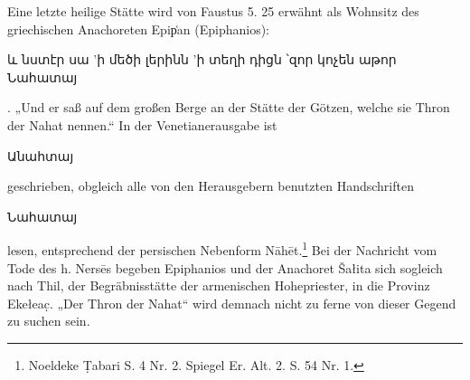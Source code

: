 \documentclass{article}
\begin{document}
Eine letzte heilige Stätte wird von Faustus 5. 25 erwähnt als Wohnsitz des griechischen Anachoreten Epip͑an (Epiphanios): \begin{armenian}և նստէր սա 'ի մեծի լերինն 'ի տեղի դիցն ՝զոր կոչեն աթոր Նահատայ\end{armenian}. „Und er saß auf dem großen Berge an der Stätte der Götzen, welche sie Thron der Nahat nennen.“ In der Venetianerausgabe ist \begin{armenian}Անահտայ\end{armenian} geschrieben, obgleich alle von den Herausgebern benutzten Handschriften \begin{armenian}Նահատայ\end{armenian} lesen, entsprechend der persischen Nebenform Nāhēt.\footnote{Noeldeke Ṭabari S. 4 Nr. 2. Spiegel Er. Alt. 2. S. 54 Nr. 1.} Bei der Nachricht vom Tode des h. Nersēs begeben Epiphanios und der Anachoret Šałita sich sogleich nach Thil, der Begräbnisstätte der armenischen Hohepriester, in die Provinz Ekełeac̣. „Der Thron der Nahat“ wird demnach nicht zu ferne von dieser Gegend zu suchen sein.
\end{document}
